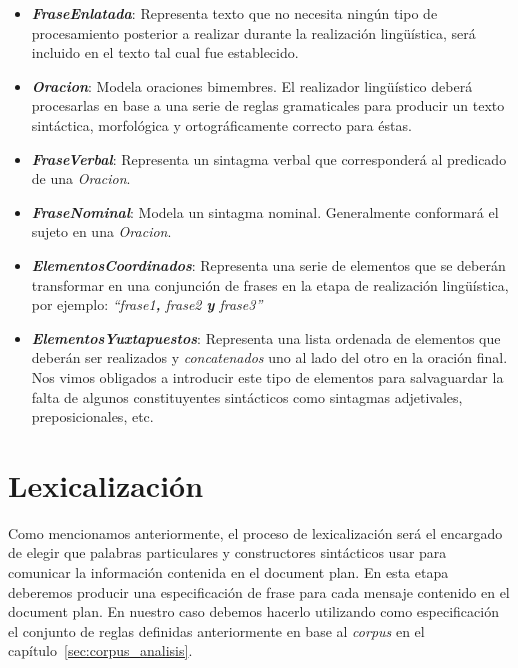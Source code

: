 \medskip
\begin{itemize}
\item{\emph{\textbf{FraseEnlatada}}: Representa texto que no necesita ningún tipo de procesamiento posterior a realizar durante la realización lingüística, será incluido en el texto tal cual fue establecido.}
\item{\emph{\textbf{Oracion}}: Modela oraciones bimembres. El realizador lingüístico deberá procesarlas en base a una serie de reglas gramaticales para producir un texto sintáctica, morfológica y ortográficamente correcto para éstas.}
\item{\emph{\textbf{FraseVerbal}}: Representa un sintagma verbal que corresponderá al predicado de una \emph{Oracion}.}
\item{\emph{\textbf{FraseNominal}}: Modela un sintagma nominal. Generalmente conformará el sujeto en una \emph{Oracion}.}
\item{\emph{\textbf{ElementosCoordinados}}: Representa una serie de elementos que se deberán transformar en una conjunción de frases en la etapa de realización lingüística, por ejemplo: \emph{``frase1\textbf{,} frase2 \textbf{y} frase3''}}
\item{\emph{\textbf{ElementosYuxtapuestos}}: Representa una lista ordenada de elementos que deberán ser realizados y \emph{concatenados} uno al lado del otro en la oración final. Nos vimos obligados a introducir este tipo de elementos para salvaguardar la falta de algunos constituyentes sintácticos como sintagmas adjetivales, preposicionales, etc.}
\end{itemize}



\section{Lexicalización}
\label{sec:microplanning_lexicalization}

Como mencionamos anteriormente, el proceso de lexicalización será el encargado de elegir que palabras particulares y constructores sintácticos usar para comunicar la información contenida en el document plan. En esta etapa deberemos producir una especificación de frase para cada mensaje contenido en el document plan. En nuestro caso debemos hacerlo utilizando como especificación el conjunto de reglas definidas anteriormente en base al \emph{corpus} en el capítulo~\ref{sec:corpus_analisis}.


